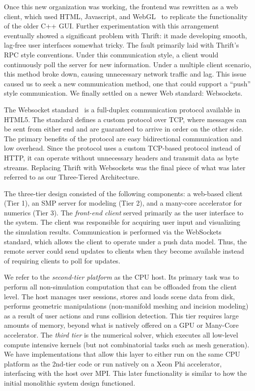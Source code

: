  Once this new organization was working, the frontend was rewritten as
 a web client, which used HTML, Javascript, and WebGL~\citep{webgl1.0}
 to replicate the functionality of the older C++ GUI. Further
 experimentation with this arrangement eventually showed a significant
 problem with Thrift: it made developing smooth, lag-free user
 interfaces somewhat tricky. The fault primarily laid with Thrift's
 RPC style conventions. Under this communication style, a client would
 continuously poll the server for new information. Under a multiple
 client scenario, this method broke down, causing unnecessary network
 traffic and lag.  This issue caused us to seek a new communication
 method, one that could support a ``push'' style communication. We
 finally settled on a newer Web standard: Websockets.

 The Websocket standard~\citep{rfc6455} is a full-duplex communication protocol
 available in HTML5. The standard defines a custom protocol over TCP, where
 messages can be sent from either end and are guaranteed to
 arrive in order on the other side. The primary benefits of the
 protocol are easy bidirectional communication and low overhead. Since
 the protocol uses a custom TCP-based protocol instead of HTTP, it can
 operate without unnecessary headers and transmit data as byte streams.
 Replacing Thrift with Websockets was the final piece of what was
 later referred to as our Three-Tiered Architecture.

 
 The three-tier design consisted of the following components: a
 web-based client (Tier 1), an SMP server for modeling (Tier 2), and a
 many-core accelerator for numerics (Tier 3).  The \emph{front-end
   client} served primarily as the user interface to the system. The
 client was responsible for acquiring user input and visualizing the
 simulation results. Communication is performed via the WebSockets
 standard, which allows the client to operate under a push data
 model. Thus, the remote server could send updates to clients when
 they become available instead of requiring clients to poll for
 updates.
 
 We refer to the \emph{second-tier platform} as the CPU host. Its
 primary task was to perform all non-simulation computation that can
 be offloaded from the client level. The host manages user sessions,
 stores and loads scene data from disk, performs geometric
 manipulations (non-manifold meshing and incision modeling) as a
 result of user actions and runs collision detection. This tier
 requires large amounts of memory, beyond what is natively offered on
 a GPU or Many-Core accelerator. The \emph{third tier} is the
 numerical solver, which executes all low-level compute intensive
 kernels (but not combinatorial tasks such as mesh generation). We
 have implementations that allow this layer to either run on the same
 CPU platform as the 2nd-tier code or run natively on a Xeon Phi
 accelerator, interfacing with the host over MPI. This later
 functionality is similar to how the initial monolithic system design
 functioned.

